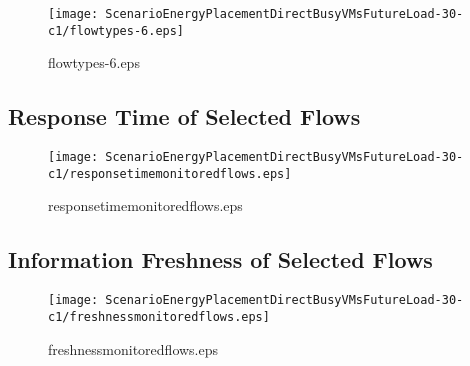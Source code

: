 \documentclass{elsart}
\begin{document}
\begin{figure}[ht]
\centering
\texttt{[image: ScenarioEnergyPlacementDirectBusyVMsFutureLoad-30-c1/flowtypes-6.eps]}
\caption{flowtypes-6.eps}\label{fig:flowtypes-6}
\end{figure}

\clearpage
\subsection{Response Time of Selected Flows}

\begin{figure}[ht]
\centering
\texttt{[image: ScenarioEnergyPlacementDirectBusyVMsFutureLoad-30-c1/responsetimemonitoredflows.eps]}
\caption{responsetimemonitoredflows.eps}\label{fig:responsetimemonitoredflows}
\end{figure}

\clearpage
\subsection{Information Freshness of Selected Flows}

\begin{figure}[ht]
\centering
\texttt{[image: ScenarioEnergyPlacementDirectBusyVMsFutureLoad-30-c1/freshnessmonitoredflows.eps]}
\caption{freshnessmonitoredflows.eps}\label{fig:freshnessmonitoredflows}
\end{figure}

\clearpage
\end{document}

